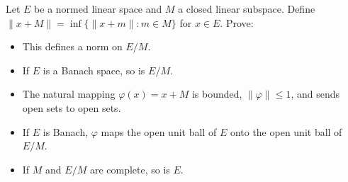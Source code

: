 Let $E$ be a normed linear space and $M$ a closed linear subspace. Define $\|x + M\| = \inf\{\|x + m\| : m \in M\}$ for $x \in E$. Prove:
\begin{itemize}
\item[(a)] This defines a norm on $E/M$.
\item[(b)] If $E$ is a Banach space, so is $E/M$.
\item[(c)] The natural mapping $\varphi(x) = x+M$ is bounded, $\|\varphi\| \leq 1$, and sends open sets to open sets.
\item[(d)] If $E$ is Banach, $\varphi$ maps the open unit ball of $E$ onto the open unit ball of $E/M$.
\item[(e)] If $M$ and $E/M$ are complete, so is $E$.
\end{itemize}
